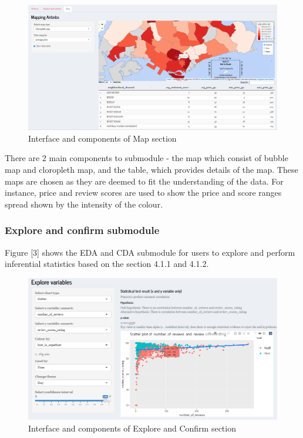 \documentclass{acm_proc_article-sp}
\begin{document}
\begin{figure}[H]

{\centering \includegraphics[width=1\linewidth]{images/design_map} 

}

\caption{Interface and components of Map section}\label{fig:unnamed-chunk-2}
\end{figure}

There are 2 main components to submodule - the map which consist of
bubble map and cloropleth map, and the table, which provides details of
the map. These maps are chosen as they are deemed to fit the
understanding of the data. For instance, price and review scores are
used to show the price and score ranges spread shown by the intensity of
the colour.

\hypertarget{explore-and-confirm-submodule}{%
\subsubsection{Explore and confirm
submodule}\label{explore-and-confirm-submodule}}

Figure {[}3{]} shows the EDA and CDA submodule for users to explore and
perform inferential statistics based on the section 4.1.1 and 4.1.2.

\begin{figure}[H]

{\centering \includegraphics[width=1\linewidth]{images/design_explore1} 

}

\caption{Interface and components of Explore and Confirm section}\label{fig:unnamed-chunk-3}
\end{figure}
\end{document}
